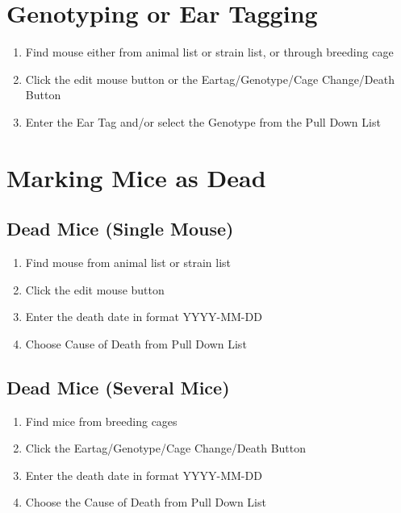 \documentclass[letterpaper,10pt,english]{sphinxmanual}
\begin{document}
\section{Genotyping or Ear Tagging}
\label{usage:genotyping-or-ear-tagging}\begin{enumerate}
\item {} 
Find mouse either from animal list or strain list, or through breeding cage

\item {} 
Click the edit mouse button or the Eartag/Genotype/Cage Change/Death Button

\item {} 
Enter the Ear Tag and/or select the Genotype from the Pull Down List

\end{enumerate}


\section{Marking Mice as Dead}
\label{usage:marking-mice-as-dead}

\subsection{Dead Mice (Single Mouse)}
\label{usage:dead-mice-single-mouse}\begin{enumerate}
\item {} 
Find mouse from animal list or strain list

\item {} 
Click the edit mouse button

\item {} 
Enter the death date in format YYYY-MM-DD

\item {} 
Choose Cause of Death from Pull Down List

\end{enumerate}


\subsection{Dead Mice (Several Mice)}
\label{usage:dead-mice-several-mice}\begin{enumerate}
\item {} 
Find mice from breeding cages

\item {} 
Click the Eartag/Genotype/Cage Change/Death Button

\item {} 
Enter the death date in format YYYY-MM-DD

\item {} 
Choose the Cause of Death from Pull Down List

\end{enumerate}
\end{document}
